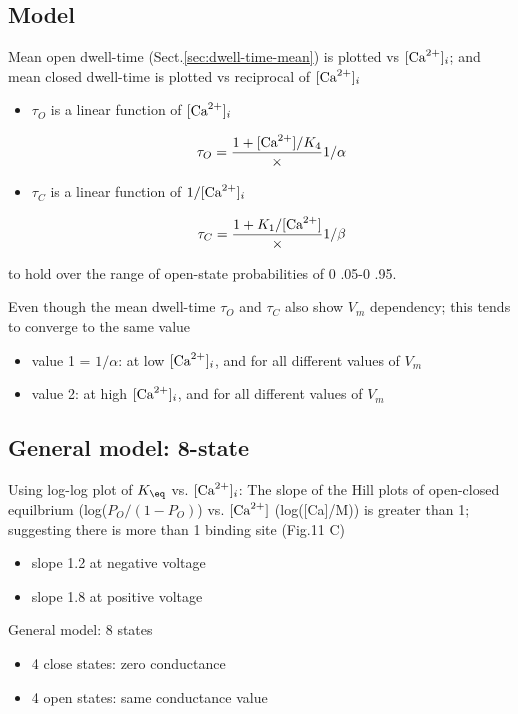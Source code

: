 \subsection{Model}

Mean open dwell-time (Sect.\ref{sec:dwell-time-mean}) is plotted vs $[{\text{Ca}^{2+}}]_i$;
and mean closed dwell-time is plotted vs reciprocal of $[{\text{Ca}^{2+}}]_i$
\begin{itemize}
  \item $\tau_O$ is a linear function of $[{\text{Ca}^{2+}}]_i$
  
\begin{equation}
\tau_O = \frac{1 + [{\text{Ca}^{2+}}]/K_4} \times 1/\alpha
\end{equation}  
  \item $\tau_C$ is a linear function of $1/[{\text{Ca}^{2+}}]_i$


\begin{equation}
\tau_C = \frac{1 + K_1/[{\text{Ca}^{2+}}]} \times 1/\beta
\end{equation}  
\end{itemize}
to hold over the range of open-state probabilities of 0 .05-0 .95.

Even though the mean dwell-time $\tau_O$ and $\tau_C$ also show $V_m$
dependency; this tends to converge to the same value 
\begin{itemize}
  \item value 1  = $1/\alpha$: at low $[{\text{Ca}^{2+}}]_i$, and for all different values of
  $V_m$

  \item value 2: at high $[{\text{Ca}^{2+}}]_i$, and for all different values of $V_m$
\end{itemize}


\subsection{General model: 8-state}


Using log-log plot of $K_\eq$ vs. $[{\text{Ca}^{2+}}]_i$:
The slope of the Hill plots of open-closed equilbrium (log($P_O/(1-P_O)$)
vs. $[{\text{Ca}^{2+}}]$ (log([Ca]/M)) is greater than 1; suggesting there is more than 1
binding site (Fig.11 C)
\begin{itemize}
  \item slope 1.2 at negative voltage
  \item slope 1.8 at positive voltage
\end{itemize}

General model: 8 states
\begin{itemize}
  \item 4 close states: zero conductance
  \item 4 open states: same conductance value
\end{itemize}

